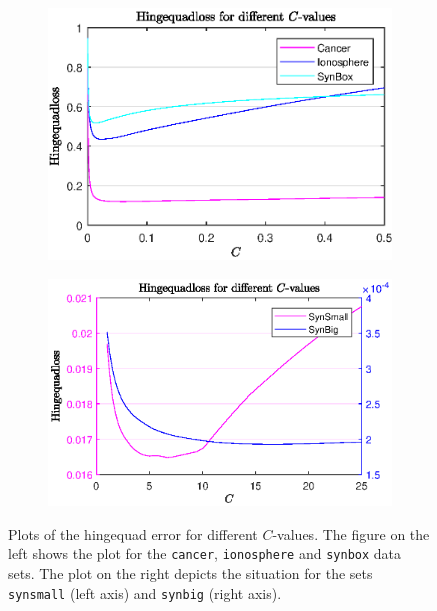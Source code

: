 \begin{figure}[ht]
	\begin{subfigure}{0.46\textwidth}
		\includegraphics[width=\textwidth]{Pictures/Plots/CanIonBox_fin.eps}%
	\end{subfigure}%
	\hfill
	\begin{subfigure}{0.52\textwidth}
		\includegraphics[width=\textwidth]{Pictures/Plots/SysSyb_fin.eps}%
	\end{subfigure}
	\caption[Objective function values]{Plots of the hingequad error for different $C$-values. The figure on the left shows the plot for the \textup{\texttt{cancer}}, \textup{\texttt{ionosphere}} and \textup{\texttt{synbox}} data sets. The plot on the right depicts the situation for the sets \textup{\texttt{synsmall}} (left axis) and \textup{\texttt{synbig}} (right axis).}%
	\label{fig_C_vs_err}%
\end{figure}


